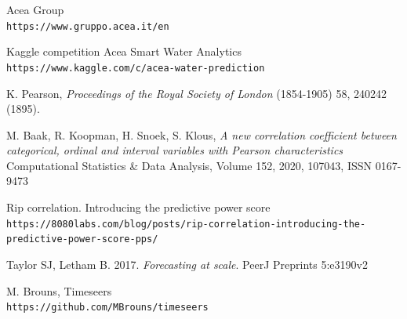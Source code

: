 \documentclass{article}
\begin{document}
\begin{thebibliography}{9}

Acea Group \\\texttt{https://www.gruppo.acea.it/en}

Kaggle competition Acea Smart Water Analytics \\\texttt{https://www.kaggle.com/c/acea-water-prediction}

K. Pearson, \textit{Proceedings of the Royal Society of London} (1854-1905) 58, 240242 (1895).

M. Baak, R. Koopman, H. Snoek, S. Klous,
\textit{A new correlation coefficient between categorical, ordinal and interval variables with Pearson characteristics}
Computational Statistics \& Data Analysis,
Volume 152,
2020,
107043,
ISSN 0167-9473

Rip correlation. Introducing the predictive power score \\\texttt{https://8080labs.com/blog/posts/rip-correlation-introducing-the-predictive-power-score-pps/}

Taylor SJ, Letham B. 2017. \textit{Forecasting at scale}. PeerJ Preprints 5:e3190v2

M. Brouns, Timeseers \\\texttt{https://github.com/MBrouns/timeseers}

\end{thebibliography}

\newpage
\end{document}

